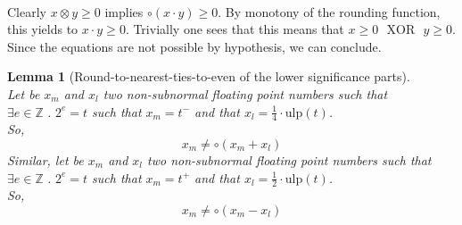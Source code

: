 \documentclass[a4paper,10pt,twoside]{article}
\newtheorem{lemma}[theorem]{Lemma}
\newenvironment{proof}[1][Proof]{\begin{trivlist}
\item[\hskip \labelsep {\bfseries #1}]}{\end{trivlist}}
\newcommand{\qed}{\nobreak \ifvmode \relax \else \ifdim \lastskip<1.5em \hskip-\lastskip
\hskip1.5em plus0em minus0.5em \fi \nobreak \vrule height0.75em width0.5em depth0.25em\fi}
\newcommand{\Z}{\ensuremath{\mathbb {Z}}}
\newcommand{\mi}{\ensuremath{\mathit{m}}}
\newcommand{\lo}{\ensuremath{\mathit{l}}}
\newcommand{\mUlp}{\ensuremath{\mathrm{ulp}}}
\newcommand{\xor}{\ensuremath{\mbox{ }\mathrm{XOR}\mbox{ }}}
\begin{document}
\begin{proof} ~ \\
Clearly $x \otimes y \geq 0$ implies $\circ \left( x \cdot y \right) \geq 0$. By monotony of the rounding function, this yields to 
$x \cdot y \geq 0$. Trivially one sees that this means that $x \geq 0 \xor y \geq 0$. Since the equations are not possible
by hypothesis, we can conclude.\qed
\end{proof}
\begin{lemma}[Round-to-nearest-ties-to-even of the lower significance parts] \label{arrpairfaible} ~ \\
Let be $x_\mi$ and $x_\lo$ two non-subnormal floating point numbers such that 
$\exists e \in \Z \mbox{ . } 2^e = t$ such that $x_\mi = t^-$
and that $x_\lo = \frac{1}{4} \cdot \mUlp\left( t \right)$. \\
So,
$$x_\mi \not = \circ \left( x_\mi + x_\lo \right)$$
Similar, let be $x_\mi$ and $x_\lo$ two non-subnormal floating point numbers such that  
$\exists e \in \Z \mbox{ . } 2^e = t$ such that $x_\mi = t^+$
and that $x_\lo = \frac{1}{2} \cdot \mUlp\left( t \right)$. \\
So,
$$x_\mi \not = \circ \left( x_\mi - x_\lo \right)$$
\end{lemma}
\end{document}
